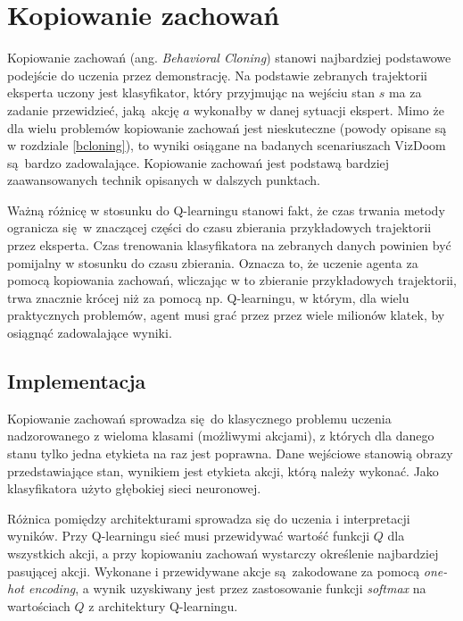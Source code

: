 \section{Kopiowanie zachowań} \label{behavioral_cloning}

Kopiowanie zachowań (ang. \textit{Behavioral Cloning}) stanowi najbardziej podstawowe podejście do uczenia przez demonstrację. Na podstawie zebranych trajektorii eksperta uczony jest klasyfikator, który przyjmując na wejściu stan $s$ ma za zadanie przewidzieć, jaką akcję $a$ wykonałby w danej sytuacji ekspert. Mimo że dla wielu problemów kopiowanie zachowań jest nieskuteczne (powody opisane są w rozdziale \ref{bcloning}), to wyniki osiągane na badanych scenariuszach VizDoom są bardzo zadowalające. Kopiowanie zachowań jest podstawą bardziej zaawansowanych technik opisanych w dalszych punktach.

Ważną różnicę w stosunku do Q-learningu stanowi fakt, że czas trwania metody ogranicza się w znaczącej części do czasu zbierania przykładowych trajektorii przez eksperta. Czas trenowania klasyfikatora na zebranych danych powinien być pomijalny w stosunku do czasu zbierania. Oznacza to, że uczenie agenta za pomocą kopiowania zachowań, wliczając w to zbieranie przykładowych trajektorii, trwa znacznie krócej niż za pomocą np. Q-learningu, w którym, dla wielu praktycznych problemów, agent musi grać przez przez wiele milionów klatek, by osiągnąć zadowalające wyniki. 

\subsection{Implementacja}

Kopiowanie zachowań sprowadza się do klasycznego problemu uczenia nadzorowanego z wieloma klasami (możliwymi akcjami), z których dla danego stanu tylko jedna etykieta na raz jest poprawna. Dane wejściowe stanowią obrazy przedstawiające stan, wynikiem jest etykieta akcji, którą należy wykonać. Jako klasyfikatora użyto głębokiej sieci neuronowej.

Różnica pomiędzy architekturami sprowadza się do uczenia i interpretacji wyników. Przy Q-learningu sieć musi przewidywać wartość funkcji $Q$ dla wszystkich akcji, a przy kopiowaniu zachowań wystarczy określenie najbardziej pasującej akcji. Wykonane i przewidywane akcje są zakodowane za pomocą \textit{one-hot encoding}, a wynik uzyskiwany jest przez zastosowanie funkcji \textit{softmax} na wartościach $Q$ z architektury Q-learningu. 

